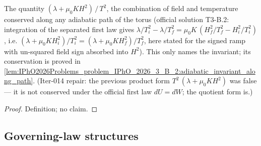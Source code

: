 \begin{definition}
\label{def:IPhO2026Problems_problem_IPhO_2026_3_B_2:adiabaticInvariant}
The quantity $(\lambda + \mu_0 K H^2)\,/\,T^2$, the combination of field
and temperature conserved along any adiabatic path of the torus (official
solution T3-B.2: integration of the separated first law gives
$\lambda/T_i^2 - \lambda/T_f^2 = \mu_0 K\,(H_f^2/T_f^2 - H_i^2/T_i^2)$,
i.e. $(\lambda + \mu_0 K H_i^2)/T_i^2 = (\lambda + \mu_0 K H_f^2)/T_f^2$,
here stated for the signed ramp with un-squared field sign absorbed into
$H^2$).  This only names the invariant; its conservation is proved in
\cref{lem:IPhO2026Problems_problem_IPhO_2026_3_B_2:adiabatic_invariant_along_path}.
(Iter-014 repair: the previous product form $T^2\,(\lambda + \mu_0 K H^2)$
was false --- it is not conserved under the official first law $dU = dW$;
the quotient form is.)
\end{definition}
\begin{proof}
Definition; no claim.
\end{proof}

\subsection*{Governing-law structures}

